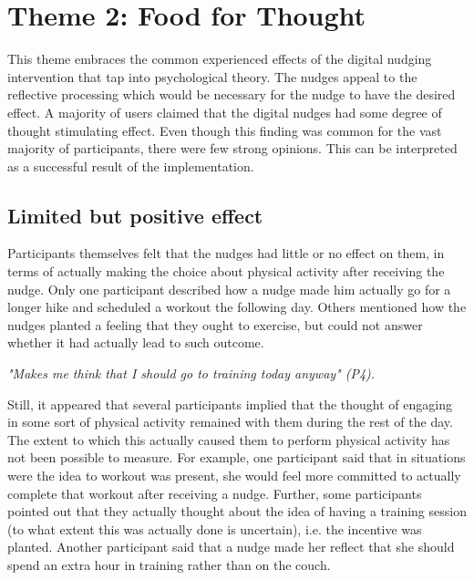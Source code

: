 \section{Theme 2: Food for Thought }
This theme embraces the common experienced effects of the digital nudging intervention that tap into psychological theory. The nudges appeal to the reflective processing which would be necessary for the nudge to have the desired effect. A majority of users claimed that the digital nudges had some degree of thought stimulating effect. Even though this finding was common for the vast majority of participants, there were few strong opinions. This can be interpreted as a successful result of the implementation. 

\subsection{Limited but positive effect }
Participants themselves felt that the nudges had little or no effect on them, in terms of actually making the choice about physical activity after receiving the nudge. Only one participant described how a nudge made him actually go for a longer hike and scheduled a workout the following day. Others mentioned how the nudges planted a feeling that they ought to exercise, but could not answer whether it had actually lead to such outcome.

\textit{"Makes me think that I should go to training today anyway" (P4).}

Still, it appeared that several participants implied that the thought of engaging in some sort of physical activity remained with them during the rest of the day. The extent to which this actually caused them to perform physical activity has not been possible to measure. For example, one participant said that in situations were the idea to workout was present, she would feel more committed to actually complete that workout after receiving a nudge. Further, some participants pointed out that they actually thought about the idea of having a training session (to what extent this was actually done is uncertain), i.e. the incentive was planted. Another participant said that a nudge made her reflect that she should spend an extra hour in training rather than on the couch. 

